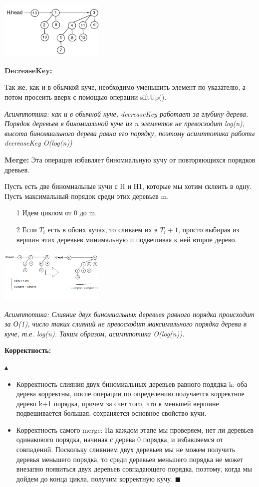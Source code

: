 \includegraphics[width = 5cm]{images/27_1}

\textbf{DecreaseKey: }

Так же, как и в обычкой куче, необходимо уменьшить элемент по указателю, а потом просеить вверх с помощью операции siftUp().

\textit{Асимптотика: как и в обычной куче, decreaseKey работает за глубину дерева. Порядок деревьев в биномиальной куче из n элементов не превосходит log(n), высота биномиального дерева равна его порядку, поэтому асимптотика работы decreaseKey O(log(n)) }

\textbf{Merge: }
Эта операция избавляет биномиальную кучу от повторяющихся порядков древьев. 

Пусть есть две биномиальные кучи с H и H1, которые мы хотим склеить в одну. Пусть максимальный порядок среди этих деревьев m. 
\begin{itemize}
    \item[1] Идем циклом от 0 до m.
    \item[2] Если $T_i$ есть в обоих кучах, то сливаем их в $T_i+1$, просто выбирая из вершин этих деревьев минимальную и подвешивая к ней второе дерево.
\end{itemize}

\includegraphics[width = 5cm]{images/27_2}

\textit{Асимптотика: Слияние двух биномиальных деревьев равного порядка происходит за О(1), число таких слияний не превосходит максимального порядка дерева в куче, т.е. log(n). Таким образом, асимптотика O(log(n)).}

\textbf{Корректность:} 

$\blacktriangle$
\begin{itemize}
    \item Корректность слияния двух биномиальных деревьев равного подядка k: оба дерева корректны, после операции по определению получается корректное дерево k+1 порядка, причем за счет того, что к меньшей вершине подвешивается большая, сохраняется основное свойство кучи.
    \item Корректность самого merge: На каждом этапе мы проверяем, нет ли деревьев одинакового порядка, начиная с дерева 0 порядка, и избавляемся от совпадений. Поскольку слиянием двух деревьев мы не можем получить деревья меньшего порядка, то среди деревьев меньшего порядка не может внезапно появиться двух деревьев совпадающего порядка, поэтому, когда мы дойдем до конца цикла, получим корректную кучу. $\blacksquare$
    
\end{itemize}

